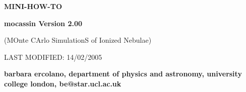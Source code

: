 \documentclass[11pt]{article}
\begin{document}
\centerline
{\Large \bf MINI-HOW-TO }

\vspace{4cm}

\centerline
{\Large \bf {\sc \Huge mocassin} Version 2.00 }

\vspace{2cm}

\centerline
{\Large (MOnte CArlo SimulationS of Ionized Nebulae) }


\vspace{3cm}

\centerline
{LAST MODIFIED: 14/02/2005}



\vspace{10cm}



\centerline
{\bf barbara ercolano, department of physics and astronomy, university college london, be@star.ucl.ac.uk} 

\vspace{10cm}


\vspace{0.7cm}

\pagebreak
\end{document}
